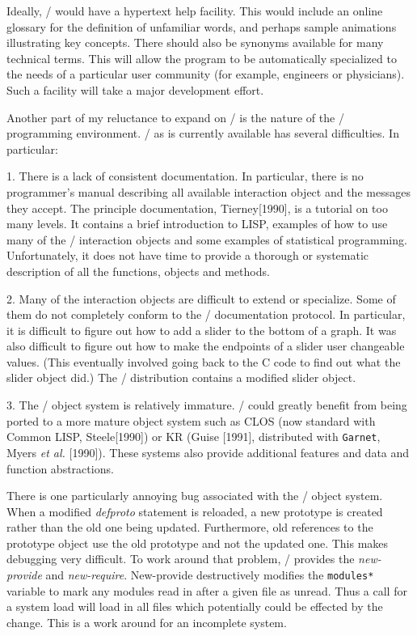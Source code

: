 Ideally, \eltoy/ would have a hypertext help facility.  This would
include an online glossary for the definition of unfamiliar words, and
perhaps sample animations illustrating key concepts.  There should
also be synonyms available for many technical terms.  This will allow
the program to be automatically specialized to the needs of a
particular user community (for example, engineers or physicians).
Such a facility will take a major development effort.

\smallskip

Another part of my reluctance to expand on \eltoy/ is the nature of
the \lispstat/ programming environment.  \xlispstat/ as is currently
available has several difficulties.  In particular:

\item{1.} There is a lack of consistent documentation.  In particular,
there is no programmer's manual describing all available interaction
object and the messages they accept.  The principle documentation,
Tierney[1990], is a tutorial on too many levels.  It contains a brief
introduction to LISP, examples of how to use many of the \lispstat/
interaction objects and some examples of statistical programming.
Unfortunately, it does not have time to provide a thorough or systematic
description of all the functions, objects and methods.

\item{2.} Many of the interaction objects are difficult to extend or
specialize.  Some of them do not completely conform to the \lispstat/
documentation protocol.  In particular, it is difficult to figure out
how to add a slider to the bottom of a graph.  It was also difficult
to figure out how to make the endpoints of a slider user changeable
values.  (This eventually involved going back to the C code to find
out what the slider object did.)  The \eltoy/ distribution contains a
modified slider object.

\item{3.} The \lispstat/ object system is relatively immature.
\lispstat/ could greatly benefit from being ported to a more mature 
object system such as CLOS (now standard with Common LISP,
Steele[1990]) or KR (Guise [1991], distributed with {\tt Garnet\/},
Myers {\it et al.\/} [1990]).  These systems also provide additional
features and data and function abstractions.

\item{} There is one particularly annoying bug associated with the
\lispstat/ object system.  When a modified {\it defproto\/} statement
is  reloaded, a new prototype is created rather than the
old one being updated.  Furthermore, old references to the prototype
object use the old prototype and not the updated one.  This makes
debugging very difficult.  To work around that problem, \eltoy/
provides the {\it new-provide\/} and {\it new-require\/}.  New-provide
destructively modifies the {\tt *modules*\/} variable to mark any
modules read in after a given file as unread.  Thus a call for a
system load will load in all files which potentially could be effected
by the change.  This is a work around for an incomplete system.


